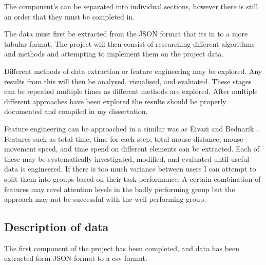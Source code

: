 \documentclass{article}
\begin{document}
The component's can be separated into individual sections, however there is still an order that they must be completed in.

The data must first be extracted from the JSON format that its in to a more tabular format.
The project will then consist of researching different algorithms and methods and attempting to implement them on the project data.

Different methods of data extraction or feature engineering may be explored.
Any results from this will then be analysed, visualised, and evaluated.
These stages can be repeated multiple times as different methods are explored.
After multiple different approaches have been explored the results should be properly documented and compiled in my dissertation.


Feature engineering can be approached in a similar was as Eivazi and Bednarik \cite{eivazi2011predicting}.
Features such as total time, time for each step, total mouse distance, mouse movement speed, and time spend on different elements can be extracted.
Each of these may be systematically investigated, modified, and evaluated until useful data is engineered.
If there is too much variance between users I can attempt to split them into groups based on their task performance.
A certain combination of features may revel attention levels in the badly performing group but the approach may not be successful with the well performing group. 


\subsection{Description of data}

The first component of the project has been completed, and data has been extracted form JSON format to a csv format.
\end{document}
